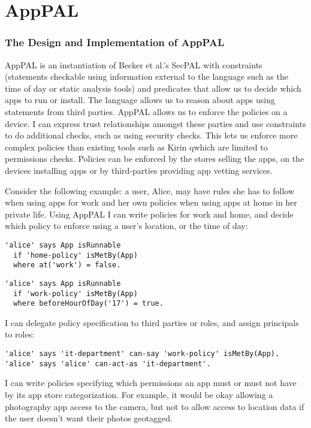 \documentclass[thesis.tex]{subfiles}
\begin{document}
\chapter{AppPAL}



\subsection{The Design and Implementation of AppPAL}

AppPAL is an instantiation of Becker et al.’s SecPAL\cite{becker_secpal:_2010} with constraints (statements checkable using information external to the language such as the time of day or static analysis tools) and predicates that allow us to decide which apps to run or install.
The language allows us to reason about apps using statements from third parties. AppPAL allows us to enforce the policies on a device.
I can express trust relationships amongst these parties and use constraints to do additional checks, such as using security checks.
This lets us enforce more complex policies than existing tools such as Kirin qwhich are limited to permissions checks. 
Policies can be enforced by the stores selling the apps, on the devices installing apps or by third-parties providing app vetting services.

Consider the following example:
  a user, Alice, may have rules she has to follow when using apps for work and her own policies when using apps at home in her private life.
Using AppPAL I can write policies for work and home, and decide which policy to enforce using a user's location, or the time of day:

\begin{lstlisting}
'alice' says App isRunnable
  if 'home-policy' isMetBy(App)
  where at('work') = false.
\end{lstlisting}
\begin{lstlisting}
'alice' says App isRunnable
  if 'work-policy' isMetBy(App)
  where beforeHourOfDay('17') = true.
\end{lstlisting}

I can delegate policy specification to third parties or roles, and assign principals to roles:

\begin{lstlisting}
'alice' says 'it-department' can-say 'work-policy' isMetBy(App).
'alice' says 'alice' can-act-as 'it-department'.
\end{lstlisting}

I can write policies specifying which permissions an app must or must not have by its app store categorization.
For example, it would be okay allowing a photography app access to the camera, but not to allow access to location data if the user doesn't want their photos geotagged.
\end{document}
